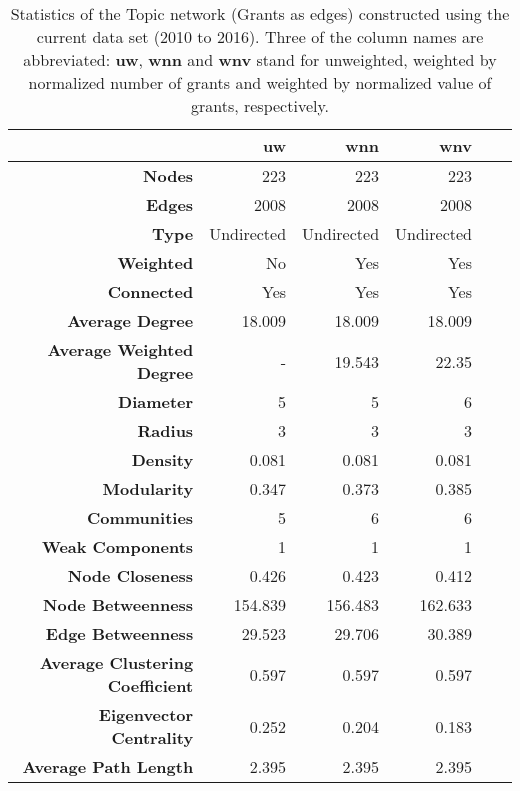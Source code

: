 \begin{table}[!htbp]
\centering
\caption[Statistics of the Topic network (Grants as edges) constructed using the current data set (2010 to 2016)]{Statistics of the Topic network (Grants as edges) constructed using the current data set (2010 to 2016). Three of the column names are abbreviated: \textbf{uw}, \textbf{wnn} and \textbf{wnv} stand for unweighted, weighted by normalized number of grants and weighted by normalized value of grants, respectively.}
\label{table:topic_a_current_stats_appendix}
\begin{tabular}{r|rrrrr}
\textbf{} & \textbf{uw} & \textbf{wnn} & \textbf{wnv}\\
\hline
\textbf{Nodes} & {223} & {223} & {223}\\
\textbf{Edges} & {2008} & {2008} & {2008}\\
\textbf{Type} & {Undirected} & {Undirected} & {Undirected}\\
\textbf{Weighted} & {No} & {Yes} & {Yes}\\
\textbf{Connected} & {Yes} & {Yes} & {Yes}\\
\textbf{Average Degree} & {18.009} & {18.009} & {18.009}\\
\textbf{Average Weighted Degree} & {-} & {19.543} & {22.35}\\
\textbf{Diameter} & {5} & {5} & {6}\\
\textbf{Radius} & {3} & {3} & {3}\\
\textbf{Density} & {0.081} & {0.081} & {0.081}\\
\textbf{Modularity} & {0.347} & {0.373} & {0.385}\\
\textbf{Communities} & {5} & {6} & {6}\\
\textbf{Weak Components} & {1} & {1} & {1}\\
\textbf{Node Closeness} & {0.426} & {0.423} & {0.412}\\
\textbf{Node Betweenness} & {154.839} & {156.483} & {162.633}\\
\textbf{Edge Betweenness} & {29.523} & {29.706} & {30.389}\\
\textbf{Average Clustering Coefficient} & {0.597} & {0.597} & {0.597}\\
\textbf{Eigenvector Centrality} & {0.252} & {0.204} & {0.183}\\
\textbf{Average Path Length} & {2.395} & {2.395} & {2.395}
\end{tabular}
\end{table}

